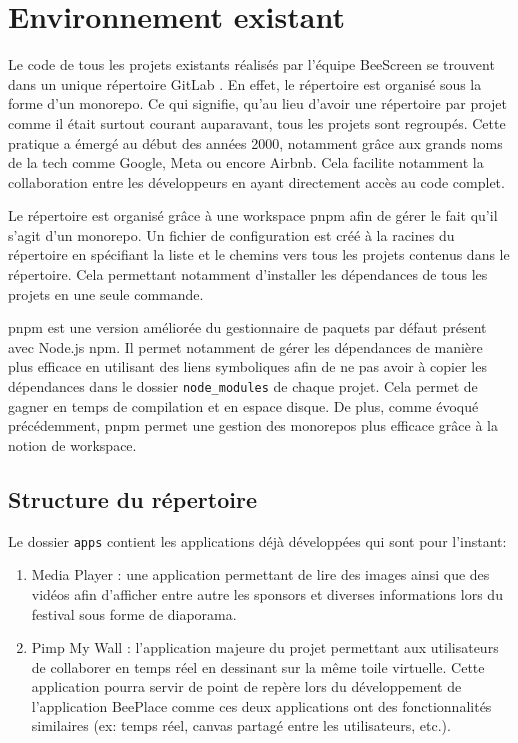 \section{Environnement existant}

Le code de tous les projets existants réalisés par l'équipe BeeScreen se trouvent dans un unique répertoire GitLab \cite{beescreens}. En effet, le répertoire est organisé sous la forme d'un monorepo. Ce qui signifie, qu'au lieu d'avoir une répertoire par projet comme il était surtout courant auparavant, tous les projets sont regroupés. Cette pratique a émergé au début des années 2000, notamment grâce aux grands noms de la tech comme Google, Meta ou encore Airbnb. Cela facilite notamment la collaboration entre les développeurs en ayant directement accès au code complet.

Le répertoire est organisé grâce à une workspace pnpm \cite{pnpmworkspace} afin de gérer le fait qu'il s'agit d'un monorepo. Un fichier de configuration est créé à la racines du répertoire en spécifiant la liste et le chemins vers tous les projets contenus dans le répertoire. Cela permettant notamment d'installer les dépendances de tous les projets en une seule commande.

pnpm est une version améliorée du gestionnaire de paquets par défaut présent avec Node.js npm. Il permet notamment de gérer les dépendances de manière plus efficace en utilisant des liens symboliques afin de ne pas avoir à copier les dépendances dans le dossier \texttt{node_modules} de chaque projet. Cela permet de gagner en temps de compilation et en espace disque. De plus, comme évoqué précédemment, pnpm permet une gestion des monorepos plus efficace grâce à la notion de workspace.

\subsection{Structure du répertoire}


Le dossier \texttt{apps} contient les applications déjà développées qui sont pour l'instant:

\begin{enumerate}
  \item Media Player : une application permettant de lire des images ainsi que des vidéos afin d'afficher entre autre les sponsors et diverses informations lors du festival sous forme de diaporama.
  \item Pimp My Wall : l'application majeure du projet permettant aux utilisateurs de collaborer en temps réel en dessinant sur la même toile virtuelle. Cette application pourra servir de point de repère lors du développement de l'application BeePlace comme ces deux applications ont des fonctionnalités similaires (ex: temps réel, canvas partagé entre les utilisateurs, etc.).
\end{enumerate}

